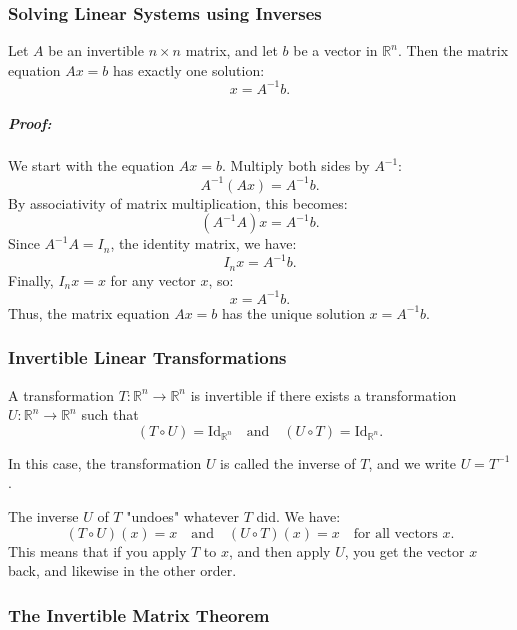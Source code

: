 \documentclass[a4paper,12pt]{article}
\begin{document}
\subsubsection{Solving Linear Systems using Inverses}

\begin{tcolorbox}[title=Theorem,colframe=blue!70!black, colback=blue!5!white]
Let \( A \) be an invertible \( n \times n \) matrix, and let \( b \) be a vector in \( \mathbb{R}^n \). Then the matrix equation \( Ax = b \) has exactly one solution:
\[
x = A^{-1} b.
\]
\end{tcolorbox}

\subparagraph{Proof:}We start with the equation \( Ax = b \). Multiply both sides by \( A^{-1} \):
\[
A^{-1} (Ax) = A^{-1} b.
\]
By associativity of matrix multiplication, this becomes:
\[
(A^{-1} A) x = A^{-1} b.
\]
Since \( A^{-1} A = I_n \), the identity matrix, we have:
\[
I_n x = A^{-1} b.
\]
Finally, \( I_n x = x \) for any vector \( x \), so:
\[
x = A^{-1} b.
\]
Thus, the matrix equation \( Ax = b \) has the unique solution \( x = A^{-1} b \).

\subsubsection{Invertible Linear Transformations}
\begin{tcolorbox}[title=Definition,colframe=blue!70!black, colback=blue!5!white]
 A transformation \( T: \mathbb{R}^n \to \mathbb{R}^n \) is invertible if there exists a transformation \( U: \mathbb{R}^n \to \mathbb{R}^n \) such that
\[
(T \circ U)= \text{Id}_{\mathbb{R}^n} \quad \text{and} \quad (U \circ T) = \text{Id}_{\mathbb{R}^n}.
\]
\end{tcolorbox}

In this case, the transformation \( U \) is called the inverse of \( T \), and we write \( U = T^{-1} \).

The inverse \( U \) of \( T \) "undoes" whatever \( T \) did. We have:
\[
(T \circ U)(x) = x \quad \text{and} \quad (U \circ T)(x) = x \quad \text{for all vectors } x.
\]
This means that if you apply \( T \) to \( x \), and then apply \( U \), you get the vector \( x \) back, and likewise in the other order.
\subsubsection{The Invertible Matrix Theorem}
\end{document}
